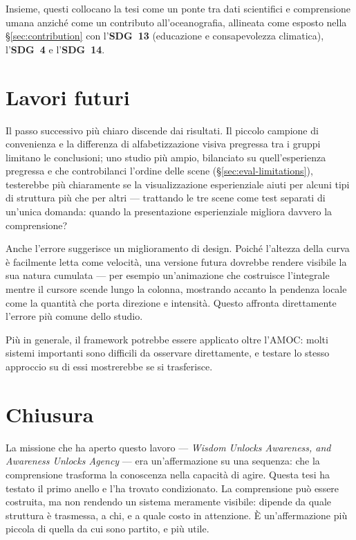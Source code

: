 Insieme, questi collocano la tesi come un ponte tra dati scientifici e comprensione umana anziché come un contributo all'oceanografia, allineata come esposto nella \S\ref{sec:contribution} con l'\textbf{SDG~13} (educazione e consapevolezza climatica), l'\textbf{SDG~4} e l'\textbf{SDG~14}.

\section{Lavori futuri}
\label{sec:concl-future}

Il passo successivo più chiaro discende dai risultati. Il piccolo campione di convenienza e la differenza di alfabetizzazione visiva pregressa tra i gruppi limitano le conclusioni; uno studio più ampio, bilanciato su quell'esperienza pregressa e che controbilanci l'ordine delle scene (\S\ref{sec:eval-limitations}), testerebbe più chiaramente se la visualizzazione esperienziale aiuti per alcuni tipi di struttura più che per altri --- trattando le tre scene come test separati di un'unica domanda: quando la presentazione esperienziale migliora davvero la comprensione?

Anche l'errore suggerisce un miglioramento di design. Poiché l'altezza della curva è facilmente letta come velocità, una versione futura dovrebbe rendere visibile la sua natura cumulata --- per esempio un'animazione che costruisce l'integrale mentre il cursore scende lungo la colonna, mostrando accanto la pendenza locale come la quantità che porta direzione e intensità. Questo affronta direttamente l'errore più comune dello studio.

Più in generale, il framework potrebbe essere applicato oltre l'AMOC: molti sistemi importanti sono difficili da osservare direttamente, e testare lo stesso approccio su di essi mostrerebbe se si trasferisce.

\section{Chiusura}
\label{sec:concl-closing}

La missione che ha aperto questo lavoro --- \emph{Wisdom Unlocks Awareness, and Awareness Unlocks Agency} --- era un'affermazione su una sequenza: che la comprensione trasforma la conoscenza nella capacità di agire. Questa tesi ha testato il primo anello e l'ha trovato condizionato. La comprensione può essere costruita, ma non rendendo un sistema meramente visibile: dipende da quale struttura è trasmessa, a chi, e a quale costo in attenzione. È un'affermazione più piccola di quella da cui sono partito, e più utile.

